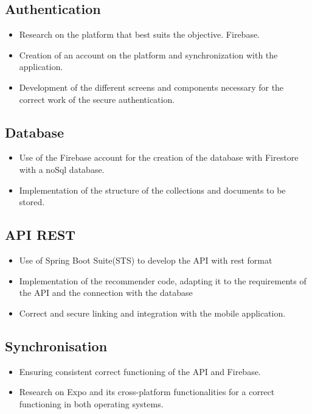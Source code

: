 \subsection*{Authentication}
\begin{itemize}
    \item Research on the platform that best suits the objective. Firebase.
    \item Creation of an account on the platform and synchronization with the application.
    \item Development of the different screens and components necessary for the correct work of the secure authentication.
\end{itemize}

\subsection*{Database}
\begin{itemize}
    \item Use of the Firebase account for the creation of the database with Firestore with a noSql database.
    \item Implementation of the structure of the collections and documents to be stored.
\end{itemize}

\subsection*{API REST}
\begin{itemize}
    \item Use of Spring Boot Suite(STS) to develop the API with rest format
    \item Implementation of the recommender code, adapting it to the requirements of the API and the connection with the database
    \item Correct and secure linking and integration with the mobile application.
\end{itemize}

\subsection*{Synchronisation}
\begin{itemize}
    \item Ensuring consistent correct functioning of the API and Firebase.
    \item Research on Expo and its cross-platform functionalities for a correct functioning in both operating systems.
\end{itemize}

